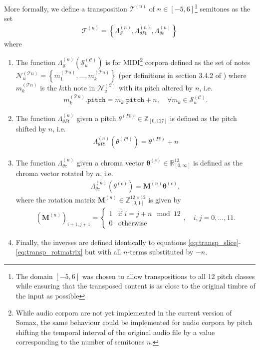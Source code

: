 More formally, we define a transposition $\mathcal T^{(n)}$ of $n \in [-5, 6]$\footnote{The domain $[-5,6]$ was chosen to allow transpositions to all 12 pitch classes while ensuring that the transposed content is as close to the original timbre of the input as possible} semitones as the set \begin{align}
		\mathcal T^{(n)} = \left\lbrace  
			\Lambda_{\mathcal S}^{(n)}, \Lambda_{\theta Pt}^{(n)}, \Lambda_{\theta c}^{(n)}\right\rbrace
 	\end{align}
 	where
 	\begin{enumerate}
 		\item [(i)] The function $\Lambda^{(n)}_{\mathcal S}\left(\mathcal S^{(\mathcal C)}_u\right)$ is for MIDI\footnote{ 	While audio corpora are not yet implemented in the current version of Somax, the same behaviour could be implemented for audio corpora by pitch shifting the temporal interval of the original audio file by a value corresponding to the number of semitones $n$. }  corpora defined as the set of notes $\mathcal N^{(\mathcal Tn)}_u = \left\lbrace m_1^{(\mathcal Tn)}, \dots , m_k^{(\mathcal Tn)}\right\rbrace$ (per definitions in section 3.4.2 of \cite{borg2020dynamic}) where $m_k^{(\mathcal Tn)}$ is the $k$:th note in $\mathcal N^{(\mathcal C)}_u$ with its pitch altered by $n$, i.e.
 			\begin{align}\label{eq:transp_slice}
				m_k^{(\mathcal Tn)}\texttt{.pitch} = m_k\texttt{.pitch} + n, \quad \forall m_k \in \mathcal S^{(\mathcal C)}_u.
			\end{align}
		\item [(ii.1)] The function $\Lambda^{(n)}_{\theta Pt}$ given a pitch $\theta^{(Pt)} \in \mathbb Z_{[0, 127]}$ is defined as the pitch shifted by $n$, i.e.
			\begin{align}\label{eq:transp_pitch}
				\Lambda^{(n)}_{\theta Pt}\left(\theta^{(Pt)}\right) = \theta^{(Pt)} + n
			\end{align}
		\item [(ii.2)] The function $\Lambda^{(n)}_{\theta c}$ given a chroma vector $\bm{\theta}^{(c)} \in \mathbb R^{12}_{[0, \infty]}$ is defined as the chroma vector rotated by $n$, i.e.
			\begin{align}\label{eq:transp_chroma}
				\Lambda^{(n)}_{\theta c}\left(\theta^{(c)}\right) = \mathbf M^{(n)} \bm{\theta}^{(c)},
			\end{align}
			where the rotation matrix $\bm M^{(n)} \in \mathbb Z^{12\times 12}_{[0,1]}$ is given by
			\begin{align}\label{eq:transp_rotmatrix}
				\left(\mathbf M^{(n)}\right)_{i+1,j+1} 
				= \left\lbrace \begin{array}{ll}
 					1 & \text{if } i = j + n \mod{12}\\
 					0 & \text{otherwise}
 				\end{array}\right., \quad i,j = 0,\dots,11.
			\end{align}
		\item [(iii)] Finally, the inverses are defined identically to equations \ref{eq:transp_slice}-\ref{eq:transp_rotmatrix} but with all $n$-terms substituted by $-n$.
 	\end{enumerate}
